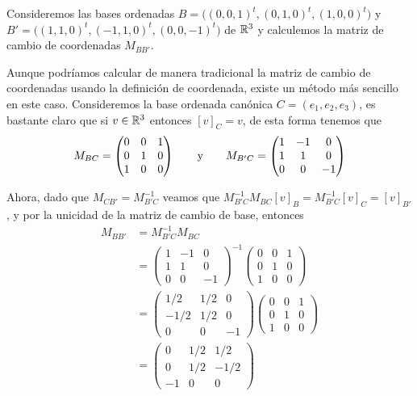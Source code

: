 \begin{example}
  Consideremos las bases ordenadas $B = \bigl( (0,0,1)^t, (0,1,0)^t, (1,0,0)^t \bigr)$ y $B' = \bigl( (1,1,0)^t, (-1, 1, 0)^t, (0,0,-1)^t \bigr)$ de $\mathbb{R}^3$ y calculemos la matriz de cambio de coordenadas $M_{BB'}$.

  \examplesolution
  Aunque podríamos calcular de manera tradicional la matriz de cambio de coordenadas usando la definición de coordenada, existe un método más sencillo en este caso. Consideremos la base ordenada canónica $C = (e_1, e_2, e_3)$, es bastante claro que si $v \in \mathbb{R}^3$ entonces $[v]_C = v$, de esta forma tenemos que
  \[
    M_{BC} = \begin{pmatrix}
      0 & 0 & 1 \\
      0 & 1 & 0 \\
      1 & 0 & 0
    \end{pmatrix} \qquad\text{y}\qquad
    M_{B'C} = \begin{pmatrix}
      1 & -1 & 0 \\
      1 & 1  & 0 \\
      0 & 0  & -1
    \end{pmatrix}
  \]

  Ahora, dado que $M_{CB'} = M_{B'C}^{-1}$ veamos que $M_{B'C}^{-1} M_{BC}[v]_B = M_{B'C}^{-1}[v]_C = [v]_{B'}$, y por la unicidad de la matriz de cambio de base, entonces
  \begin{align*}
    M_{BB'} &= M_{B'C}^{-1} M_{BC} \\
      &= \begin{pmatrix}
        1 & -1 & 0 \\
        1 & 1  & 0 \\
        0 & 0  & -1
        \end{pmatrix}^{-1}
        \begin{pmatrix}
        0 & 0 & 1 \\
        0 & 1 & 0 \\
        1 & 0 & 0
        \end{pmatrix}  \\
      &= \begin{pmatrix}
        1/2  & 1/2 & 0 \\
        -1/2 & 1/2 & 0 \\
        0    & 0   & -1
        \end{pmatrix}
        \begin{pmatrix}
        0 & 0 & 1 \\
        0 & 1 & 0 \\
        1 & 0 & 0
        \end{pmatrix} \\
      &= \begin{pmatrix}
        0 & 1/2  & 1/2  \\
        0 & 1/2  & -1/2 \\
        -1 & 0    & 0
        \end{pmatrix}
  \end{align*}
\end{example}



